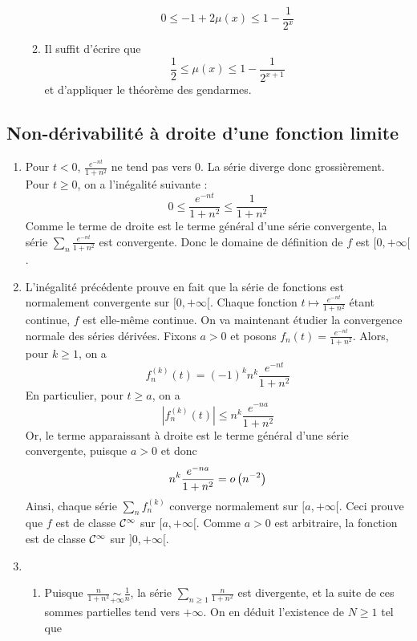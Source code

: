 \begin{enumerate}
\begin{enumerate}
                    \[
                        0\leqslant -1+2\mu(x)\leqslant 1-\frac{1}{2^x}
                    \]
                \item Il suffit d'écrire que 
                    \[
                        \frac{1}{2}\leqslant \mu(x)\leqslant 1-\frac{1}{2^{x+1}}
                    \]
                    et d'appliquer le théorème des gendarmes.
            \end{enumerate}
\end{enumerate}
\subsection{Non-dérivabilité à droite d'une fonction limite}

\begin{enumerate}
    \item Pour $t<0$, $\frac{e^{-nt}}{1+n^2}$ ne tend pas vers 0. La série diverge donc grossièrement.
Pour $t\geqslant 0$, on a l'inégalité suivante :
        \[
            0\leqslant\frac{e^{-nt}}{1+n^2}\leqslant \frac{1}{1+n^2}
        \]
        Comme le terme de droite est le terme général d'une série convergente, la série $\sum\limits_n \frac{e^{-nt}}{1+n^2}$ est convergente. Donc le domaine de définition de $f$ est $[0,+\infty[$.
    \item L'inégalité précédente prouve en fait que la série de fonctions est normalement convergente sur $[0,+\infty[$. Chaque fonction $t\mapsto \frac{e^{-nt}}{1+n^2}$ étant continue, $f$ est elle-même continue. On va maintenant étudier la convergence normale des séries dérivées. Fixons $a>0$ et posons $f_n(t)=\frac{e^{-nt}}{1+n^2}$. Alors, pour $k\geqslant 1$, on a
        \[
            f_n^{(k)}(t)=(-1)^k n^k \frac{e^{-nt}}{1+n^2}
        \]
        En particulier, pour $t\geqslant a$, on a 
        \[
            \left|f_n^{(k)}(t)\right|\leqslant n^k\frac{e^{-na}}{1+n^2}
        \]
        Or, le terme apparaissant à droite est le terme général d'une série convergente, puisque $a>0$ et donc
        \[
            n^k \frac{e^{-na}}{1+n^2}=o\left(n^{-2}\right)
        \]
        Ainsi, chaque série $\sum_n f_n^{(k)}$ converge normalement sur $[a,+\infty[$. Ceci prouve que $f$ est de classe $\mathcal{C}^\infty$ sur $[a,+\infty[$. Comme $a>0$ est arbitraire, la fonction est de classe $\mathcal{C}^\infty$ sur $]0,+\infty[$.
        \item 
            \begin{enumerate}
                \item Puisque $\frac{n}{1+n^2}\underset{+\infty}{\sim}\frac{1}{n}$, la série $\sum\limits_{n\geqslant 1}\frac{n}{1+n^2}$ est divergente, et la suite de ces sommes partielles tend vers $+\infty$. On en déduit l'existence de $N\geqslant 1$ tel que 

\end{enumerate}
\end{enumerate}
